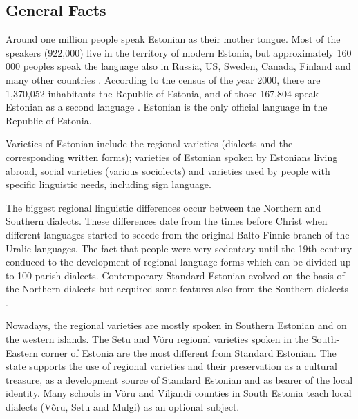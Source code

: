 \documentclass[]{../metanetpaper}
\begin{document}
\clearpage


\begin{multicols}{2}

\subsection{General Facts}

Around one million people speak Estonian as their mother tongue. 
Most of the speakers (922,000) live in the territory of modern Estonia, but approximately 160 000 peoples speak the language also in Russia, US, Sweden, Canada, Finland and many other countries \cite{Stat1}.
According to the census of the year 2000, there are 1,370,052 inhabitants the Republic of Estonia, and of those 167,804 speak Estonian as a second language \cite{Stat2}. 
Estonian is the only official language in the Republic of Estonia.


Varieties of Estonian include the regional varieties (dialects and the corresponding written forms); varieties of Estonian spoken by Estonians living abroad, social varieties (various sociolects) and varieties used by people with specific linguistic needs, including sign language.

The biggest regional linguistic differences occur between the Northern and Southern dialects. 
These differences date from the times before Christ when different languages started to secede from the original Balto-Finnic branch of the Uralic languages. 
The fact that people were very sedentary until the 19th century conduced to the development of regional language forms which can be divided up to 100 parish dialects. 
Contemporary Standard Estonian evolved on the basis of the Northern dialects but acquired some features also from the Southern dialects \cite{KeeleStratEn}.

Nowadays, the regional varieties are mostly spoken in Southern Estonian and on the western islands. 
The Setu and Võru regional varieties spoken in the South-Eastern corner of Estonia are the most different from Standard Estonian. 
The state supports the use of regional varieties and their preservation as a cultural treasure, as a development source of Standard Estonian and as bearer of the local identity. 
Many schools in Võru and Viljandi counties in South Estonia teach local dialects (Võru, Setu and Mulgi) as an optional subject.


\end{multicols}
\end{document}
